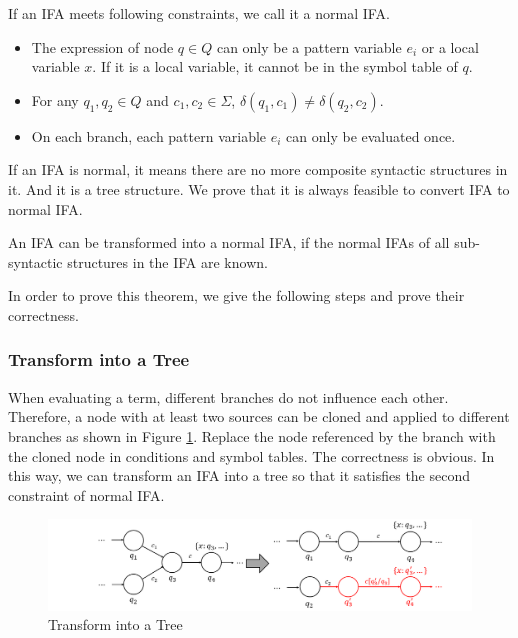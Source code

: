 \begin{Def}
\label{def:nmlifa}
If an IFA meets following constraints, we call it a normal IFA.
\begin{itemize}
    \item The expression of node $q \in Q$ can only be a pattern variable $e_i$ or a local variable $x$. If it is a local variable, it cannot be in the symbol table of $q$.
    \item For any $q_1,q_2 \in Q$ and $c_1, c_2 \in \Sigma$, $\delta(q_1, c_1) \neq \delta(q_2, c_2)$.
    \item On each branch, each pattern variable $e_i$ can only be evaluated once.
\end{itemize}
\end{Def}

If an IFA is normal, it means there are no more composite syntactic structures in it. And it is a tree structure. We  prove that it is always feasible to convert IFA to normal IFA.

\begin{mythm}
\label{mythm:nmlifa}
An IFA can be transformed into a normal IFA, if the normal IFAs of all sub-syntactic structures in the IFA are known.
\end{mythm}

In order to prove this theorem, we give the following steps and prove their correctness.

\subsubsection{Transform into a Tree}

When evaluating a term, different branches do not influence each other. Therefore, a node with at least two sources can be cloned and applied to different branches as shown in Figure \ref{fig:nmlifa-tree}. Replace the node referenced by the branch with the cloned node in conditions and symbol tables. The correctness is obvious. In this way, we can transform an IFA into a tree so that it satisfies the second constraint of normal IFA.

\begin{figure}[t]
	\centering
    \includegraphics[scale=0.25]{images/nmlifa/nmlifa-tree.png}
	\caption{Transform into a Tree}
	\label{fig:nmlifa-tree}
\end{figure}


